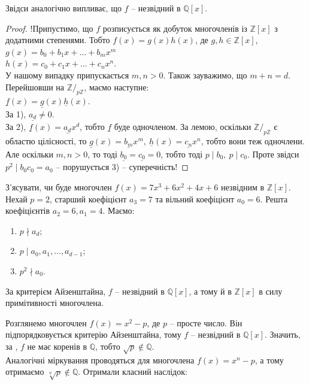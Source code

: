 \documentclass{math_library}
\begin{document}
\begin{remark}
Звідси аналогічно випливає, що $f$ -- незвідний в $\mathbb{Q}[x]$.
\end{remark}

\begin{proof}
!Припустимо, що $f$ розписується як добуток многочленів із $\mathbb{Z}[x]$ з додатними степенями. Тобто $f(x) = g(x) h(x)$, де $g,h \in \mathbb{Z}[x]$,\\
$g(x) = b_0 + b_1 x + \dots + b_m x^m$\\
$h(x) = c_0 + c_1 x + \dots + c_n x^n$.\\
У нашому випадку припускається $m,n > 0$. Також зауважимо, що $m + n = d$. Перейшовши на $\mathbb{Z}/_{p \mathbb{Z}}$, маємо наступне:\\
$\underline{f}(x) = \underline{g}(x) \underline{h}(x)$.\\
За 1), $\underline{a_d} \neq 0$.\\
За 2), $\underline{f}(x) = \underline{a_d} x^d$, тобто $\underline{f}$ буде одночленом. За лемою, оскільки $\mathbb{Z}/_{p \mathbb{Z}}$ є областю цілісності, то $\underline{g}(x) = \underline{b_m} x^m,\ \underline{h}(x) = \underline{c_n} x^n$, тобто вони теж одночлени. Але оскільки $m,n > 0$, то тоді $\underline{b_0} = \underline{c_0} = 0$, тобто тоді $p \mid b_0,\ p \mid c_0$. Проте звідси $p^2 \mid b_0 c_0 = a_0$ -- порушується 3) -- суперечність!
\end{proof}

\begin{example}
З'ясувати, чи буде многочлен $f(x) = 7x^3 + 6x^2 + 4x + 6$ незвідним в $\mathbb{Z}[x]$.\\
Нехай $p = 2$, старший коефіцієнт $a_3 = 7$ та вільний коефіцієнт $a_0 = 6$. Решта коефіцієнтів $a_2 = 6, a_1 = 4$. Маємо:
\begin{enumerate}[nosep, wide=0pt, label={\arabic*)}]
\item $p \nmid a_d$;
\item $p \mid a_0,a_1,\dots,a_{d-1}$;
\item $p^2 \nmid a_0$.
\end{enumerate}
За критерієм Айзенштайна, $f$ -- незвідний в $\mathbb{Q}[x]$, а тому й в $\mathbb{Z}[x]$ в силу примітивності многочлена.
\end{example}

\begin{example}
Розглянемо многочлен $f(x) = x^2 - p$, де $p$ -- просте число. Він підпорядковується критерію Айзенштайна, тому $f$ -- незвідний в $\mathbb{Q}[x]$. Значить, за , $f$ не має коренів в $\mathbb{Q}$, тобто $\sqrt{p} \notin \mathbb{Q}$.\\
Аналогічні міркування проводяться для многочлена $f(x) = x^n - p$, а тому отримаємо $\sqrt[n]{p} \notin \mathbb{Q}$. Отримали класний наслідок:
\end{example}
\end{document}
